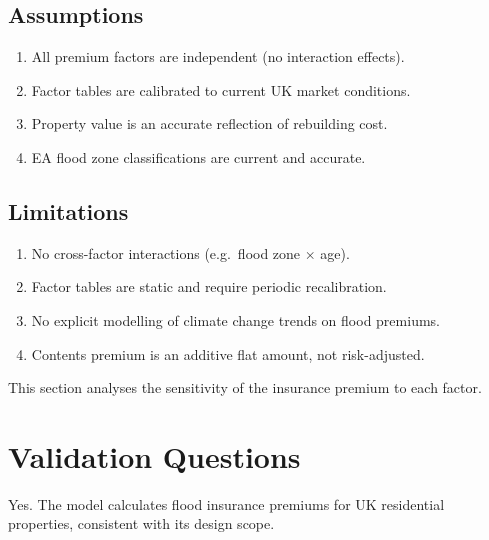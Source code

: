 \documentclass[11pt,a4paper]{article}
\begin{document}
\subsection{Assumptions}
\begin{enumerate}[nosep]
    \item All premium factors are independent (no interaction effects).
    \item Factor tables are calibrated to current UK market conditions.
    \item Property value is an accurate reflection of rebuilding cost.
    \item EA flood zone classifications are current and accurate.
\end{enumerate}

\subsection{Limitations}
\begin{enumerate}[nosep]
    \item No cross-factor interactions (e.g.\ flood zone $\times$ age).
    \item Factor tables are static and require periodic recalibration.
    \item No explicit modelling of climate change trends on flood premiums.
    \item Contents premium is an additive flat amount, not risk-adjusted.
\end{enumerate}


\mkmsensitivity

This section analyses the sensitivity of the insurance premium to each factor.




\section{Validation Questions}

Yes. The model calculates flood insurance premiums for UK residential properties,
consistent with its design scope.
\end{document}
